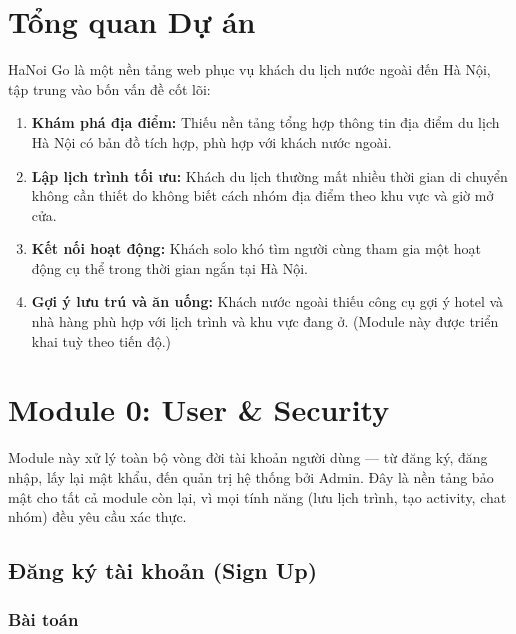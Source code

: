 \documentclass[12pt,a4paper]{article}
\begin{document}

\section{Tổng quan Dự án}

HaNoi Go là một nền tảng web phục vụ khách du lịch nước ngoài đến Hà Nội, tập
trung vào bốn vấn đề cốt lõi:

\begin{enumerate}
  \item \textbf{Khám phá địa điểm:} Thiếu nền tảng tổng hợp thông tin địa điểm
        du lịch Hà Nội có bản đồ tích hợp, phù hợp với khách nước ngoài.
  \item \textbf{Lập lịch trình tối ưu:} Khách du lịch thường mất nhiều thời gian
        di chuyển không cần thiết do không biết cách nhóm địa điểm theo khu vực
        và giờ mở cửa.
  \item \textbf{Kết nối hoạt động:} Khách solo khó tìm người cùng tham gia một
        hoạt động cụ thể trong thời gian ngắn tại Hà Nội.
  \item \textbf{Gợi ý lưu trú và ăn uống:} Khách nước ngoài thiếu công cụ gợi ý
        hotel và nhà hàng phù hợp với lịch trình và khu vực đang ở.
        (Module này được triển khai tuỳ theo tiến độ.)
\end{enumerate}

\section{Module 0: User \& Security}

Module này xử lý toàn bộ vòng đời tài khoản người dùng --- từ đăng ký, đăng
nhập, lấy lại mật khẩu, đến quản trị hệ thống bởi Admin. Đây là nền tảng
bảo mật cho tất cả module còn lại, vì mọi tính năng (lưu lịch trình, tạo
activity, chat nhóm) đều yêu cầu xác thực.

\subsection{Đăng ký tài khoản (Sign Up)}

\subsubsection{Bài toán}
\end{document}
